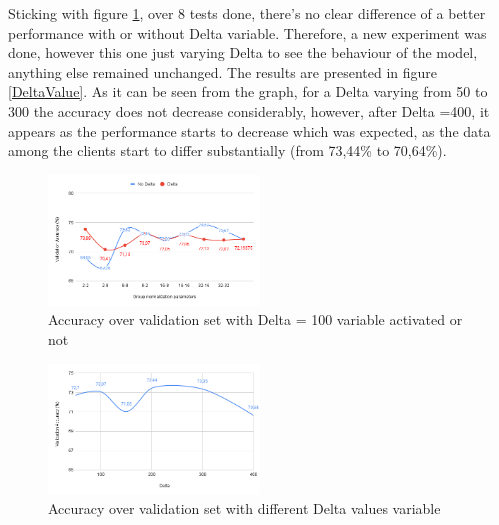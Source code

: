 \documentclass[twocolumn]{article}
\begin{document}
Sticking with figure \ref{AccDiff}, over 8 tests done, there's no clear difference of a better performance with or without Delta variable. Therefore, a new experiment was done, however this one just varying Delta to see the behaviour of the model, anything else remained unchanged. The results are presented in figure \ref{DeltaValue}. As it can be seen from the graph, for a Delta varying from 50 to 300 the accuracy does not decrease considerably, however, after Delta =400, it appears as the performance starts to decrease which was expected, as the data among the clients start to differ substantially (from 73,44\% to 70,64\%).



\begin{figure}
    \centering
    \includegraphics[width=0.5\textwidth,height=.3\textheight]{groupnormalizationDeltaNoDelta.png}
    \caption{Accuracy over validation set with Delta = 100 variable activated or not}
     \label{AccDiff} 
\end{figure}

\begin{figure}
    \centering
    \includegraphics[width=0.5\textwidth,height=.3\textheight]{deltacomparison.png}
    \caption{Accuracy over validation set with different Delta values variable}
     \label{DeltaValues} 
\end{figure}
\end{document}
